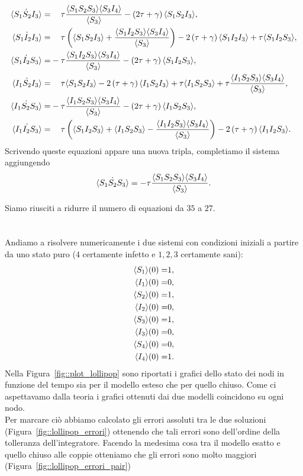  \begin{equation*}
 \begin{aligned}
\dot{\angol{S_1S_2I_3}}=&\spa \tau \frac{\angol{S_1S_2S_3}\angol{S_3I_4}}{\angol{S_3}} -\tonde{ 2\tau + \gamma} \angol{S_1S_2I_3},\\
\dot{\angol{S_1I_2I_3}} =&\spa \tau \tonde{ \angol{S_1S_2I_3}+\frac{\angol{S_1I_2S_3}\angol{S_3I_4}}{\angol{S_3} }} -2\tonde{ \tau + \gamma} \angol{S_1I_2I_3} + \tau \angol{S_1 I_2 S_3},\\
\dot{\angol{S_1I_2S_3}} =&-\tau \frac{\angol{S_1I_2S_3}\angol{S_3I_4}}{\angol{S_3}} -\tonde{ 2\tau + \gamma} \angol{S_1I_2S_3},\\
\dot{\angol{I_1S_2I_3}} =&\spa \tau  \angol{S_1S_2I_3} -2\tonde{ \tau + \gamma} \angol{I_1S_2I_3} + \tau \angol{I_1S_2S_3}+\tau \frac{\angol{I_1S_2S_3}\angol{S_3I_4}}{\angol{S_3}},\\
\dot{\angol{I_1S_2S_3}}=&-\tau \frac{\angol{ I_1S_2S_3}\angol{S_3I_4}}{\angol{S_3}}-\tonde{ 2 \tau + \gamma} \angol{I_1S_2S_3},\\
\dot{\angol{I_1I_2S_3}} =&\spa\tau \tonde{  \angol{S_1I_2S_3}+ \angol{I_1S_2S_3} - \frac{\angol{I_1I_2S_3}\angol{S_3I_4}}{\angol{S_3}}} -2\tonde{ \tau + \gamma} \angol{I_1I_2S_3}.
 	\end{aligned}
 	\end{equation*}
 Scrivendo queste equazioni appare una nuova tripla, completiamo il sistema aggiungendo 
$$\dot{\langle S_1 S_2 S_3 \rangle} = -\tau\frac{\langle S_1S_2S_3 \rangle\langle S_3I_4 \rangle}{\langle S_3 \rangle}.$$
 
Siamo riusciti a ridurre il numero di equazioni da $35$ a $27$.\\ \\ \\
 Andiamo a risolvere numericamente i due sistemi con condizioni iniziali a partire da uno stato puro ($4$ certamente infetto e $1,2,3$ certamente sani):
\begin{equation}
\label{statipuri_lollipop}
\begin{aligned}
\langle S_1 \rangle(0) =& 1, \\
\langle I_1 \rangle(0) =& 0,\\
\langle S_2 \rangle(0) = &1, \\
\langle I_2 \rangle(0) = &0,\\
\langle S_3 \rangle(0) = &1, \\
\langle I_3 \rangle(0) = &0,\\
\langle S_4 \rangle(0) =& 0, \\
\langle I_4 \rangle(0) = &1.
\end{aligned}
\end{equation}
Nella Figura~\ref{fig::plot_lollipop} sono riportati i grafici dello stato dei nodi in funzione del tempo sia per il modello esteso che per quello chiuso. Come ci aspettavamo dalla teoria i grafici ottenuti dai due modelli coincidono su ogni nodo.\\
Per marcare ci\`o abbiamo calcolato gli errori assoluti tra le due soluzioni (Figura~\ref{fig::lollipop_errori}) ottenendo che tali errori sono dell'ordine della tolleranza dell'integratore. Facendo la medesima cosa tra il modello esatto e quello chiuso alle coppie otteniamo che gli errori sono molto maggiori (Figura~\ref{fig::lollipop_errori_pair})

